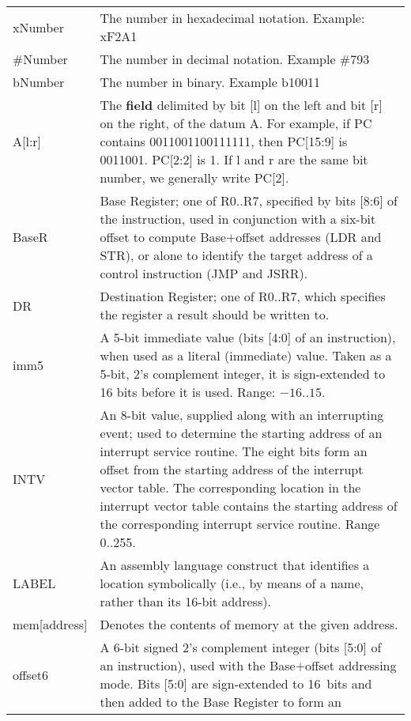 \documentclass{patt}
\begin{document}
\begin{table}[t]
\vspace{-8pt} 
{\begin{tabular}{@{\hspace{6pt}}lP{24pc}@{}}
 & \\
\midrule
xNumber & The number in hexadecimal notation. Example: xF2A1\\
\#Number & The number in decimal notation. Example \#793\\
bNumber & The number in binary. Example b10011\\
A[l:r] & The {\bf field} delimited by bit [l] on the left and bit
[r] on the right, of the
 datum A. For example, if PC contains 0011001100111111, then
 PC[15:9] is 0011001. PC[2:2] is 1. If l and r are the same bit
 number, we generally write PC[2].\\
BaseR & Base Register; one of R0..R7, specified by bits [8:6] of the 
 instruction, used in conjunction with a six-bit offset to
 compute Base$+$offset addresses (LDR and STR), or alone to identify the 
 target address of a control instruction (JMP and JSRR).\\
DR & Destination Register; one of R0..R7, which specifies the register 
 a result should be written to.\\
imm5 & A 5-bit immediate value (bits [4:0] of an instruction), when
 used as a literal (immediate) value. Taken as a 5-bit, 2's
 complement integer, it is sign-extended to 16 bits before it is used. 
 Range: $-16..15$. \\
INTV & An 8-bit value, supplied along with an interrupting event; used
to determine the starting address of an interrupt service routine.
The eight bits form an offset from the starting address of the interrupt 
vector table. The corresponding location in the interrupt vector table 
contains the starting address of the corresponding interrupt service routine. 
Range {0..255}. \\
LABEL & An assembly language construct that identifies a location
 symbolically (i.e., by
 means of a name, rather than its 16-bit address). \\
mem[address] & Denotes the contents of memory at the given address. \\
offset6 & A 6-bit signed 2's complement integer (bits [5:0] of an instruction),
 used with the Base$+$offset addressing mode. Bits [5:0] are 
 sign-extended to 16~bits and then added to the Base Register to form an

\end{tabular}}
\end{table}
\end{document}

